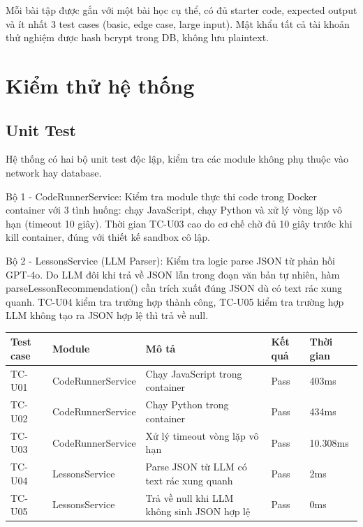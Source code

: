 \documentclass[../main.tex]{subfiles}
\begin{document}
Mỗi bài tập được gắn với một bài học cụ thể, có đủ starter code, expected output và ít nhất 3 test cases (basic, edge case, large input). Mật khẩu tất cả tài khoản thử nghiệm được hash bcrypt trong DB, không lưu plaintext.

\section{Kiểm thử hệ thống}

\subsection{Unit Test}

Hệ thống có hai bộ unit test độc lập, kiểm tra các module không phụ thuộc vào network hay database.

Bộ 1 - CodeRunnerService: Kiểm tra module thực thi code trong Docker container với 3 tình huống: chạy JavaScript, chạy Python và xử lý vòng lặp vô hạn (timeout 10 giây). Thời gian TC-U03 cao do cơ chế chờ đủ 10 giây trước khi kill container, đúng với thiết kế sandbox cô lập.

Bộ 2 - LessonsService (LLM Parser): Kiểm tra logic parse JSON từ phản hồi GPT-4o. Do LLM đôi khi trả về JSON lẫn trong đoạn văn bản tự nhiên, hàm parseLessonRecommendation() cần trích xuất đúng JSON dù có text rác xung quanh. TC-U04 kiểm tra trường hợp thành công, TC-U05 kiểm tra trường hợp LLM không tạo ra JSON hợp lệ thì trả về null.


{
\renewcommand{\arraystretch}{1.5}
\begin{tabularx}{\textwidth}{|p{2.0cm}|p{4cm}|>{\raggedright\arraybackslash}X|p{2.0cm}|p{2.0cm}|}
\caption{Kết quả Unit Test}
\label{tab:ket-qua-unit-test}
\\
\hline
\textbf{Test case} & \textbf{Module} & \textbf{Mô tả} & \textbf{Kết quả} & \textbf{Thời gian} \\
\hline
TC-U01 & CodeRunnerService & Chạy JavaScript trong container & Pass & 403ms \\
\hline
TC-U02 & CodeRunnerService & Chạy Python trong container & Pass & 434ms \\
\hline
TC-U03 & CodeRunnerService & Xử lý timeout vòng lặp vô hạn & Pass & 10.308ms \\
\hline
TC-U04 & LessonsService & Parse JSON từ LLM có text rác xung quanh & Pass & 2ms \\
\hline
TC-U05 & LessonsService & Trả về null khi LLM không sinh JSON hợp lệ & Pass & 0ms \\
\hline
\end{tabularx}
}
\end{document}
